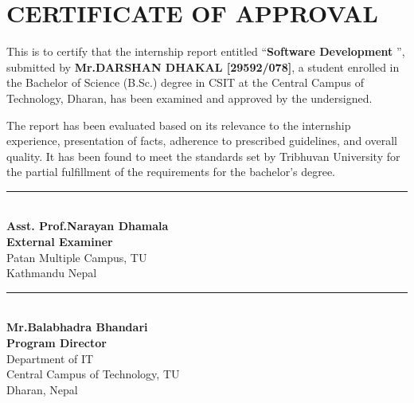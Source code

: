 \section*{\centering \Large \textbf{CERTIFICATE OF APPROVAL}}

This is to certify that the internship report entitled ``{\bf Software Development }'', submitted by {\bf Mr\@.\@ DARSHAN DHAKAL [29592/078]}, a student enrolled in the Bachelor of Science (B.Sc.) degree in CSIT at the Central Campus of Technology, Dharan, has been examined and approved by the undersigned.

The report has been evaluated based on its relevance to the internship experience, presentation of facts, adherence to prescribed guidelines, and overall quality. It has been found to meet the standards set by Tribhuvan University for the partial fulfillment of the requirements for the bachelor’s degree.\vspace{2cm}

\noindent
\begin{minipage}[t]{0.45\textwidth}
    \centering
    \rule{5cm}{0.4pt} \\
    \textbf{Asst. Prof.\@ Narayan Dhamala} \\
    {\bf External Examiner}\\
    Patan Multiple Campus, TU\\
    Kathmandu Nepal\\[3em]


\end{minipage}
\hfill
\begin{minipage}[t]{0.45\textwidth}
    \centering
    \rule{6cm}{0.4pt} \\
    \textbf{Mr.\@ Balabhadra Bhandari} \\
    {\bf Program Director}\\
    Department of IT\\
    Central Campus of Technology, TU\\
    Dharan, Nepal\\[3em]
\end{minipage}

\newpage
